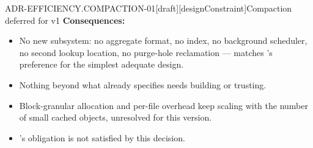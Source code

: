 \begin{requirement}{ADR-EFFICIENCY.COMPACTION-01}[draft][designConstraint]{Compaction deferred for v1}
  \textbf{Consequences:}
  \begin{itemize}
    \item[+] No new subsystem: no aggregate format, no index, no
      background scheduler, no second lookup location, no purge-hole
      reclamation --- matches 's preference for the
      simplest adequate design.
    \item[+] Nothing beyond what  already
      specifies needs building or trusting.
    \item[--] Block-granular allocation and per-file overhead keep scaling
      with the number of small cached objects, unresolved for this
      version.
    \item[--] 's obligation is not
      satisfied by this decision.
  \end{itemize}



\end{requirement}

